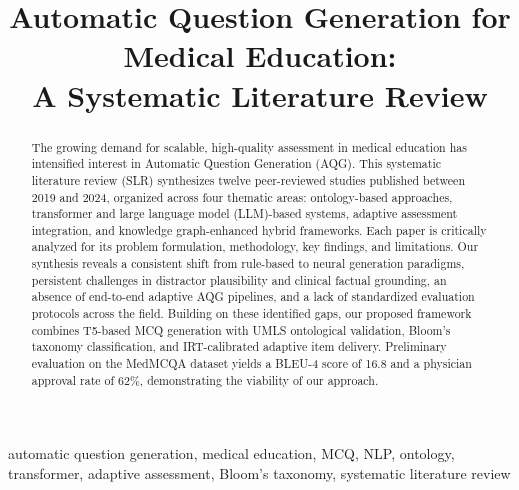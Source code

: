 \documentclass[conference]{IEEEtran}
\begin{document}
\title{Automatic Question Generation for Medical Education:\\
A Systematic Literature Review}

\author{
\and
{}
\and
{}
}

\maketitle

\begin{abstract}
The growing demand for scalable, high-quality assessment in medical education has intensified interest in Automatic Question Generation (AQG). This systematic literature review (SLR) synthesizes twelve peer-reviewed studies published between 2019 and 2024, organized across four thematic areas: ontology-based approaches, transformer and large language model (LLM)-based systems, adaptive assessment integration, and knowledge graph-enhanced hybrid frameworks. Each paper is critically analyzed for its problem formulation, methodology, key findings, and limitations. Our synthesis reveals a consistent shift from rule-based to neural generation paradigms, persistent challenges in distractor plausibility and clinical factual grounding, an absence of end-to-end adaptive AQG pipelines, and a lack of standardized evaluation protocols across the field. Building on these identified gaps, our proposed framework combines T5-based MCQ generation with UMLS ontological validation, Bloom's taxonomy classification, and IRT-calibrated adaptive item delivery. Preliminary evaluation on the MedMCQA dataset yields a BLEU-4 score of 16.8 and a physician approval rate of 62\%, demonstrating the viability of our approach.
\end{abstract}

\begin{IEEEkeywords}
automatic question generation, medical education, MCQ, NLP, ontology, transformer, adaptive assessment, Bloom's taxonomy, systematic literature review
\end{IEEEkeywords}
\end{document}
